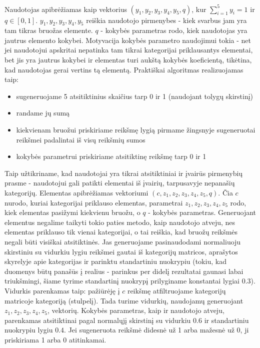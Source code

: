 \documentclass{VUMIFInfMagistrinis}
\begin{document}
\indent
Naudotojas apibrėžiamas kaip vektorius $(y_1, y_2, y_3, y_4, y_5, q)$, kur $\sum\limits_{i=1}^{5} y_i = 1$ ir $q\in[0,1]$. $y_1, y_2, y_3, y_4, y_5$ reiškia naudotojo pirmenybes - kiek svarbus jam yra tam tikras bruožas elemente.
$q$ - kokybės parametras rodo, kiek naudotojas yra jautrus elemento kokybei. Motyvacija kokybės parametro naudojimui tokia - net jei naudotojui apskritai nepatinka tam tikrai kategorijai priklausantys elementai, bet jis yra jautrus kokybei ir elementas turi aukštą kokybės koeficientą, tikėtina, kad naudotojas gerai vertins tą elementą.
\newline
\indent 
Praktiškai algoritmas realizuojamas taip:
\begin{itemize}
	\item sugeneruojame 5 atsitiktinius skaičius tarp 0 ir 1 (naudojant tolygų skirstinį)
	\item randame jų sumą
	\item kiekvienam bruožui priskiriame reikšmę lygią pirmame žingsnyje sugeneruotai reikšmei padalintai iš visų reikšmių sumos
	\item kokybės parametrui priskiriame atsitiktinę reikšmę tarp 0 ir 1
\end{itemize}
Taip užtikriname, kad naudotojai yra tikrai atsitiktiniai ir įvairūs pirmenybių prasme - naudotojui gali patikti elementai iš įvairių, tarpusavyje nepanašių kategorijų.
\indent
Elementas apibrėžiamas vektoriumi $(c, z_1, z_2, z_3, z_4, z_5, q)$. Čia $c$ nurodo, kuriai kategorijai priklauso elementas, parametrai $z_1, z_2, z_3, z_4, z_5$ rodo, kiek elementas pasižymi kiekvienu bruožu, o $q$ - kokybės parametras. Generuojant elementus negalime taikyti tokio paties metodo, kaip naudotojo atveju, nes elementas priklauso tik vienai kategorijai, o tai reiškia, kad bruožų reikšmės negali būti visiškai atsitiktinės. Jas generuojame pasinaudodami normaliuoju skirstiniu su vidurkiu lygiu reikšmei gautai iš kategorijų matricos, aprašytos skyrelyje apie kategorijas ir parinktu standartiniu nuokrypiu (tokiu, kad duomenys būtų panašūs į realius - parinkus per didelį rezultatai gaunasi labai triukšmingi, šiame tyrime standartinį nuokrypį prilyginame konstantai lygiai 0.3). Vidurkis parenkamas taip: pažiūrėję į $c$ reikšmę atfiltruojame kategorijų matricoje kategoriją (stulpelį). Tada turime vidurkių, naudojamų generuojant $z_1, z_2, z_3, z_4, z_5$, vektorių. Kokybės parametras, kaip ir naudotojo atveju, parenkamas atsitiktinai pagal normalųjį skirstinį su vidurkiu $0.6$ ir standartiniu nuokrypiu lygiu $0.4$. Jei sugeneruota reikšmė didesnė už 1 arba mažesnė už 0, ji priskiriama 1 arba 0 atitinkamai.
\end{document}
